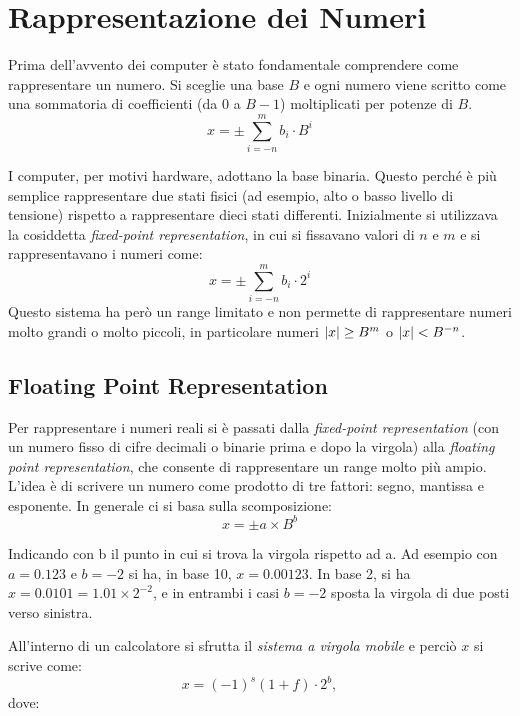 \documentclass[letterpaper,12pt]{article}
\DeclarePairedDelimiter{\abs}{\lvert}{\rvert} %
\begin{document}
\section{Rappresentazione dei Numeri}
    Prima dell'avvento dei computer è stato fondamentale comprendere come rappresentare un numero. Si sceglie una base $B$ 
    e ogni numero viene scritto come una sommatoria di coefficienti (da 0 a $B-1$) moltiplicati per potenze di $B$. 
    \[
        x = \pm\sum_{i=-n}^{m} b_i \cdot B^i
    \]  

    I computer, per motivi hardware, adottano la base binaria. Questo perché è più semplice rappresentare due stati fisici 
    (ad esempio, alto o basso livello di tensione) rispetto a rappresentare dieci stati differenti.
    Inizialmente si utilizzava la cosiddetta \textit{fixed-point representation}, in cui si fissavano valori di $n$ e $m$
    e si rappresentavano i numeri come:
    \[
        x = \pm\sum_{i=-n}^{m} b_i \cdot 2^i
    \]
    Questo sistema ha però un range limitato e non permette di rappresentare numeri molto grandi o molto piccoli, in
    particolare numeri $ \abs{x} \geq B^m $ o $\abs{x} < B^{-n}$.

    \subsection{Floating Point Representation}
        Per rappresentare i numeri reali si è passati dalla \textit{fixed-point representation} (con un numero fisso di 
        cifre decimali o binarie prima e dopo la virgola) alla \textit{floating point representation}, che consente di 
        rappresentare un range molto più ampio. L'idea è di scrivere un numero come prodotto di tre fattori: segno,
        mantissa e esponente. In generale ci si basa sulla scomposizione:
        \[
            x = \pm a \times B^b
        \]

        Indicando con b il punto in cui si trova la virgola rispetto ad a. Ad esempio con $a = 0.123$ e $b = -2$ si ha,
        in base 10, $x = 0.00123$. In base 2, si ha $x = 0.0101 = 1.01 \times 2^{-2}$, e in entrambi i casi $b = -2$ 
        sposta la virgola di due posti verso sinistra. 
    
        All'interno di un calcolatore si sfrutta il \textit{sistema a virgola mobile} e perciò $x$ si scrive come:
        \begin{equation}\label{eq:x_vm}
            x = (-1)^s (1 + f) \cdot 2^b,
        \end{equation}
        dove:
\end{document}

